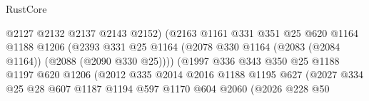 \begin{lexlean}{RustCore}
\begin{coremodule}
                                        @2127
                                        @2132
                                        @2137
                                        @2143
                                        @2152)
                                      (@2163
                                        @1161
                                        @331
                                        @351
                                        @25
                                        @620
                                        @1164
                                        @1188
                                        @1206
                                        (@2393
                                          @331
                                          @25
                                          @1164
                                          (@2078
                                            @330
                                            @1164
                                            (@2083 (@2084 @1164))
                                            (@2088 (@2090 @330 @25))))
                                        (@1997
                                          @336
                                          @343
                                          @350
                                          @25
                                          @1188
                                          @1197
                                          @620
                                          @1206
                                          (@2012
                                            @335
                                            @2014
                                            @2016
                                            @1188
                                            @1195
                                            @627
                                            (@2027
                                              @334
                                              @25
                                              @28
                                              @607
                                              @1187
                                              @1194
                                              @597
                                              @1170
                                              @604
                                              @2060
                                              (@2026
                                                @228
                                                @50

\end{coremodule}
\end{lexlean}
